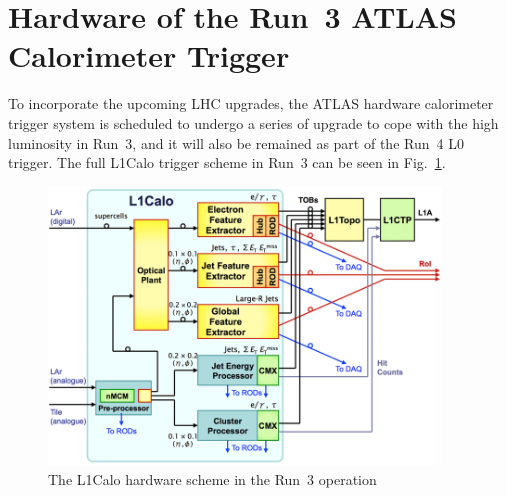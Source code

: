 \section{Hardware of the Run~3 ATLAS Calorimeter Trigger}
To incorporate the upcoming LHC upgrades, the ATLAS hardware calorimeter trigger system is scheduled to undergo a series of upgrade to cope with the high luminosity in Run~3, and it will also be remained as part of the Run~4 L0 trigger. The full L1Calo trigger scheme in Run~3 can be seen in Fig.~\ref{Fig:l1calo_scheme}.
\begin{figure}[!h]                
	\includegraphics[width=0.93\textwidth]{Chapter6/L1Calo.png}
	\begin{center}
		\caption{The L1Calo hardware scheme in the Run~3 operation\cite{Schwienhorst:2016efd}}
		\label{Fig:l1calo_scheme}            
	\end{center}
\end{figure}
\noindent
